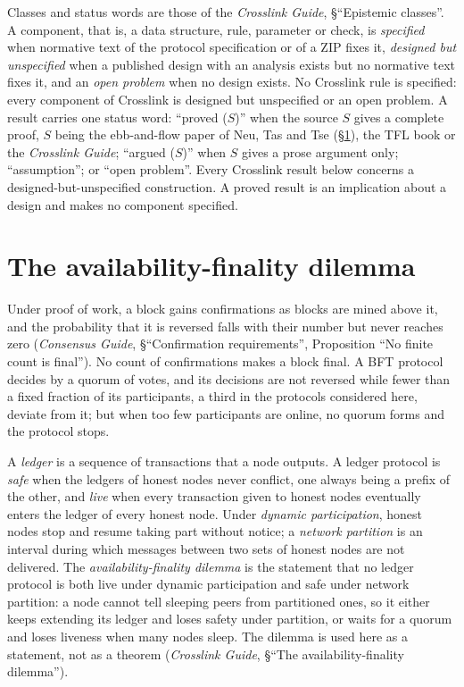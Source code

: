 \documentclass[11pt,a4paper]{article}
\theoremstyle{definition}
\begin{document}
Classes and status words are those of the \emph{Crosslink Guide},
\S``Epistemic classes''. A component, that is, a data structure, rule,
parameter or check, is \emph{specified} when normative text of the protocol
specification or of a ZIP fixes it, \emph{designed but unspecified} when a
published design with an analysis exists but no normative text fixes it, and
an \emph{open problem} when no design exists. No Crosslink rule is
specified: every component of Crosslink is designed but unspecified or an
open problem. A result carries one status word: ``proved ($S$)'' when the
source $S$ gives a complete proof, $S$ being the ebb-and-flow paper of Neu,
Tas and Tse (\S\ref{sec:problem}), the TFL book or the \emph{Crosslink
Guide}; ``argued ($S$)'' when $S$ gives a prose argument only;
``assumption''; or ``open problem''. Every Crosslink result below concerns
a designed-but-unspecified construction. A proved result is an implication
about a design and makes no component specified.

\section{The availability-finality dilemma}\label{sec:problem}

Under proof of work, a block gains confirmations as blocks are mined above
it, and the probability that it is reversed falls with their number but
never reaches zero (\emph{Consensus Guide}, \S``Confirmation requirements'',
Proposition ``No finite count is final''). No count of confirmations makes a
block final. A BFT protocol decides by a quorum of votes, and its decisions
are not reversed while fewer than a fixed fraction of its participants, a
third in the protocols considered here, deviate from it; but when too few
participants are online, no quorum forms and the protocol stops.

A \emph{ledger} is a sequence of transactions that a node outputs. A ledger
protocol is \emph{safe} when the ledgers of honest nodes never conflict, one
always being a prefix of the other, and \emph{live} when every transaction
given to honest nodes eventually enters the ledger of every honest node.
Under \emph{dynamic participation}, honest nodes stop and resume taking part
without notice; a \emph{network partition} is an interval during which
messages between two sets of honest nodes are not delivered. The
\emph{availability-finality dilemma} is the statement that no ledger
protocol is both live under dynamic participation and safe under network
partition: a node cannot tell sleeping peers from partitioned ones, so it
either keeps extending its ledger and loses safety under partition, or waits
for a quorum and loses liveness when many nodes sleep. The dilemma is used
here as a statement, not as a theorem (\emph{Crosslink Guide}, \S``The
availability-finality dilemma'').
\end{document}
